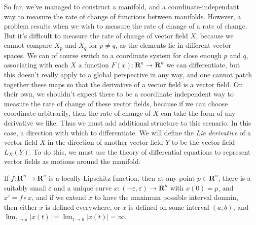 So far, we've managed to construct a manifold, and a coordinate-independant way to measure the rate of change of functions between manifolds. However, a problem results when we wish to measure the rate of change of a rate of change. But it's difficult to measure the rate of change of vector field $X$, because we cannot compare $X_p$ and $X_q$ for $p \neq q$, as the elements lie in different vector spaces. We can of course switch to a coordinate system for close enough $p$ and $q$, associating with each $X$ a function $F(x) : \mathbf{R}^n \to \mathbf{R}^n$ we can differentiate, but this doesn't really apply to a global perspective in any way, and one cannot patch together these maps so that the derivative of a vector field is a vector field. On their own, we shouldn't expect there to be a coordinate independent way to measure the rate of change of these vector fields, because if we can choose coordinate arbitrarily, then the rate of change of $X$ can take the form of any derivative we like. Thus we must add additional structure to this scenario. In this case, a direction with which to differentiate. We will define the {\it Lie derivative} of a vector field $X$ in the direction of another vector field $Y$ to be the vector field $L_X(Y)$. To do this, we must use the theory of differential equations to represent vector fields as motions around the manifold.

\begin{theorem}
    If $f: \mathbf{R}^n \to \mathbf{R}^n$ is a locally Lipschitz function, then at any point $p \in \mathbf{R}^n$, there is a suitably small $\varepsilon$ and a unique curve $x: (-\varepsilon, \varepsilon) \to \mathbf{R}^n$ with $x(0) = p$, and $x' = f \circ x$, and if we extend $x$ to have the maximum possible interval domain, then either $x$ is defined everywhere, or $x$ is defined on some interval $(a,b)$, and $\lim_{t \to a} |x(t)| = \lim_{t \to b} |x(t)| = \infty$.
\end{theorem}


